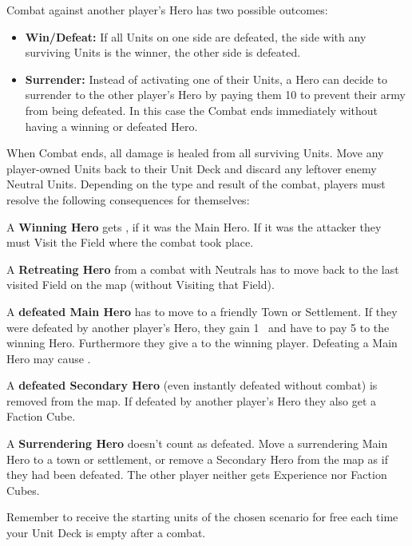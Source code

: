 \begin{multicols*}{2}
Combat against another player's Hero has two possible outcomes:
\begin{itemize}
 \item \textbf{Win/Defeat:} If all Units on one side are defeated, the side with any surviving Units is the winner, the other side is defeated.
 \item \textbf{Surrender:} Instead of activating one of their Units, a Hero can decide to surrender to the other player's Hero by paying them 10  to prevent their army from being defeated. In this case the Combat ends immediately without having a winning or defeated Hero.
\end{itemize}
\vspace{0.5em}
\par

\newpage
When Combat ends, all damage is healed from all surviving Units. Move any player-owned Units back to their Unit Deck and discard any leftover enemy Neutral Units. Depending on the type and result of the combat, players must resolve the following consequences for themselves:

A \textbf{Winning Hero} gets , if it was the Main Hero. If it was the attacker they must Visit the Field where the combat took place.\par
A \textbf{Retreating Hero} from a combat with Neutrals has to move back to the last visited Field on the map (without Visiting that Field).\par
A \textbf{defeated Main Hero} has to move to a friendly Town or Settlement. If they were defeated by another player's Hero, they gain 1~ and have to pay 5  to the winning Hero. Furthermore they give a  to the winning player. Defeating a Main Hero may cause .\par
A \textbf{defeated Secondary Hero} (even instantly defeated without combat) is removed from the map. If defeated by another player's Hero they also get a Faction Cube.\par
A \textbf{Surrendering Hero} doesn't count as defeated. Move a surrendering Main Hero to a town or settlement, or remove a Secondary Hero from the map as if they had been defeated. The other player neither gets Experience nor Faction Cubes.\par
Remember to receive the starting units of the chosen scenario for free each time your Unit Deck is empty after a combat.


\end{multicols*}
